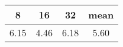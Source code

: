 \begin{tabular}{|c|c|c|c|}
\hline
\textbf{8}&\textbf{16}&\textbf{32}&\textbf{mean}\\\hline
6.15&4.46&6.18&5.60\\\hline
\end{tabular}
